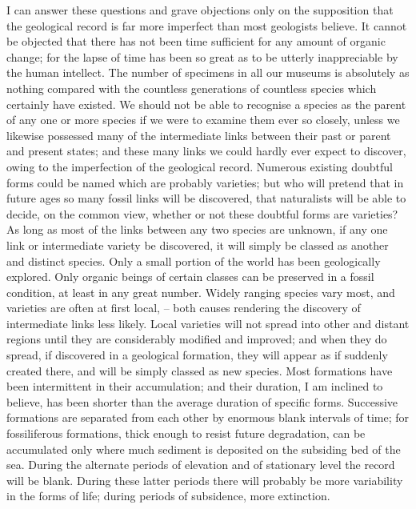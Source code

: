 \indent I can answer these questions and grave objections only on the supposition that the geological record is far more imperfect than most geologists believe. It cannot be objected that there has not been time sufficient for any amount of organic change; for the lapse of time has been so great as to be utterly inappreciable by the human intellect. The number of specimens in all our museums is absolutely as nothing compared with the countless generations of countless species which certainly have existed. We should not be able to recognise a species as the parent of any one or more species if we were to examine them ever so closely, unless we likewise possessed many of the intermediate links between their past or parent and present states; and these many links we could hardly ever expect to discover, owing to the imperfection of the geological record. Numerous existing doubtful forms could be named which are probably varieties; but who will pretend that in future ages so many fossil links will be discovered, that naturalists will be able to decide, on the common view, whether or not these doubtful forms are varieties? As long as most of the links between any two species are unknown, if any one link or intermediate variety be discovered, it will simply be classed as another and distinct species. Only a small portion of the world has been geologically explored. Only organic beings of certain classes can be preserved in a fossil condition, at least in any great number. Widely ranging species vary most, and varieties are often at first local, -- both causes rendering the discovery of intermediate links less likely. Local varieties will not spread into other and distant regions until they are considerably modified and improved; and when they do spread, if discovered in a geological formation, they will appear as if suddenly created there, and will be simply classed as new species. Most formations have been intermittent in their accumulation; and their duration, I am inclined to believe, has been shorter than the average duration of specific forms. Successive formations are separated from each other by enormous blank intervals of time; for fossiliferous formations, thick enough to resist future degradation, can be accumulated only where much sediment is deposited on the subsiding bed of the sea. During the alternate periods of elevation and of stationary level the record will be blank.  During these latter periods there will probably be more variability in the forms of life; during periods of subsidence, more extinction.~\\
